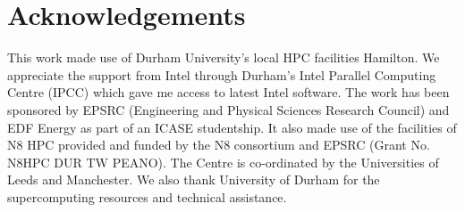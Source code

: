 \section{Acknowledgements}
\label{section:acknowledgements}

This work made use of Durham University's local HPC facilities Hamilton.
We appreciate the support from Intel through Durham's Intel Parallel Computing
Centre (IPCC) which gave me access to latest Intel software.
The work has been sponsored by EPSRC (Engineering and Physical Sciences Research Council) and EDF Energy as part of an ICASE studentship. It also made use of the facilities of N8 HPC provided and funded by the N8 consortium and EPSRC (Grant No. N8HPC \textunderscore DUR \textunderscore TW \textunderscore PEANO). The Centre is co-ordinated by the Universities of Leeds and Manchester. We also thank University of Durham for the supercomputing resources and technical assistance.
